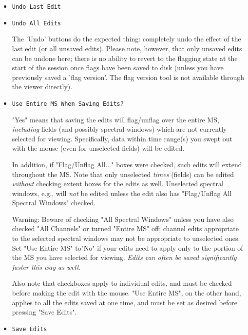 \begin{itemize}
{\bf Note:} You do not need to include the entire 'antenna block' in your
rectangle (and you may stray into the next antenna if you try). Anywhere
within the block will work.  To flag higher-numbered antennas, it often
helps to zoom in.

\item {\tt Undo Last Edit}

\item {\tt Undo All Edits}

The 'Undo' buttons do the expected thing: completely undo the effect of
the last edit (or all unsaved edits).  Please note,
however, that only unsaved edits can be undone here;
there is no ability to revert to the flagging state at the start of the
session once flags have been saved to disk (unless you have previously
saved a 'flag version'.  The flag version tool is not available through
the viewer directly).

\item {\tt Use Entire MS When Saving Edits?}

"Yes" means that saving the edits will flag/unflag over the entire MS,
{\it including} fields (and possibly spectral windows) which are not 
currently selected for viewing.  Specifically, data within time range(s)
you swept out with the mouse (even for unselected fields) will be edited.

In addition, if "Flag/Unflag All..." boxes were checked, such edits will
extend throughout the MS.  Note that only
unselected {\it times} (fields) can be edited {\it without} checking
extent boxes for the edits as well.  Unselected spectral windows, e.g.,
will {\it not} be edited unless the edit also has "Flag/Unflag All
Spectral Windows" checked.  

Warning: Beware of checking "All Spectral Windows" unless you have also 
checked "All Channels" or turned "Entire MS" off; channel edits appropriate 
to the selected spectral windows may not be appropriate to unselected
ones.  Set "Use Entire MS" to"No" if your edits need to apply only to the
portion of the MS you have selected for viewing.  {\it Edits can often be
saved significantly faster this way as well}.

Also note that checkboxes apply to individual edits, and must be checked
before making the edit with the mouse.  "Use Entire MS", on the other hand,
applies to all the edits saved at one time, and must be set as desired
before pressing "Save Edits".

\item {\tt Save Edits}


\end{itemize}
